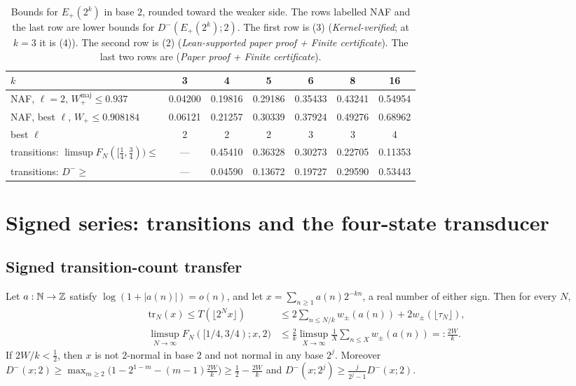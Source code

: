 \documentclass[11pt]{article}
\newcommand{\wpm}{w_{\pm}}
\newcommand{\tr}{\mathrm{tr}}
\begin{document}
\begin{table}[ht]
\centering\small
\begin{tabular}{@{}lcccccc@{}}
\toprule
$k$ & 3 & 4 & 5 & 6 & 8 & 16 \\
\midrule
NAF, $\ell=2$, $W_+^{\mathrm{maj}}\le0.937$ & 0.04200 & 0.19816 & 0.29186 & 0.35433 & 0.43241 & 0.54954 \\
NAF, best $\ell$, $W_+\le0.908184$ & 0.06121 & 0.21257 & 0.30339 & 0.37924 & 0.49276 & 0.68962 \\
\quad best $\ell$ & 2 & 2 & 2 & 3 & 3 & 4 \\
transitions: $\limsup F_N([\frac14,\frac34))\le$ & --- & 0.45410 & 0.36328 & 0.30273 & 0.22705 & 0.11353 \\
transitions: $D^-\ge$ & --- & 0.04590 & 0.13672 & 0.19727 & 0.29590 & 0.53443 \\
\bottomrule
\end{tabular}
\caption{Bounds for $E_+(2^k)$ in base $2$, rounded toward the weaker side. The rows labelled NAF and the last row are lower bounds for $D^-(E_+(2^k);2)$. The first row is (3) (\emph{Kernel-verified}; at $k=3$ it is (4)). The second row is (2) (\emph{Lean-supported paper proof + Finite certificate}). The last two rows are  (\emph{Paper proof + Finite certificate}).}\label{tab:Eplus}
\end{table}

\section{Signed series: transitions and the four-state transducer}\label{sec:signed}

\subsection{Signed transition-count transfer}

\begin{theorem}\label{thm:signed-transfer}
Let $a:\mathbb N\to\mathbb Z$ satisfy $\log(1+|a(n)|)=o(n)$, and let $x=\sum_{n\ge1}a(n)2^{-kn}$, a real number of either sign. Then for every $N$,
\begin{align*}
\tr_N(x)\le T(\lfloor2^Nx\rfloor)&\le2\sum_{n\le N/k}\wpm(a(n))+2\wpm(\lfloor\tau_N\rfloor),\\
\limsup_{N\to\infty}F_N([1/4,3/4);x,2)&\le\frac2k\limsup_{X\to\infty}\frac1X\sum_{n\le X}\wpm(a(n))=:\frac{2W}k.
\end{align*}
If $2W/k<\frac12$, then $x$ is not $2$-normal in base $2$ and not normal in any base $2^j$. Moreover $D^-(x;2)\ge\max_{m\ge2}\bigl(1-2^{1-m}-(m-1)\frac{2W}k\bigr)\ge\frac12-\frac{2W}k$ and $D^-(x;2^j)\ge\frac j{2^j-1}D^-(x;2)$.
\end{theorem}
\end{document}
